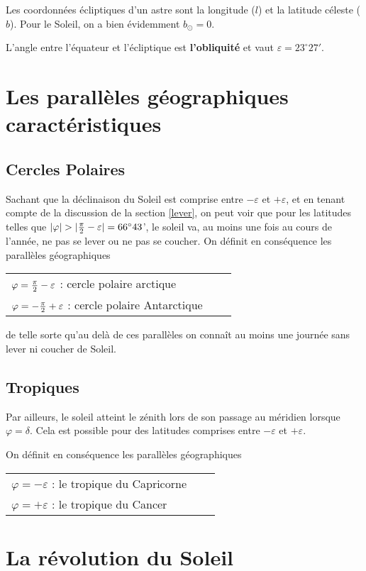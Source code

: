 \documentclass[12pt]{report}
\def\sun{\odot}
\begin{document}
Les coordonnées écliptiques d'un astre sont la longitude ($l$) et la latitude céleste ($b$). Pour le Soleil, on a bien évidemment $b_\sun=0$. 

L'angle entre l'équateur et l'écliptique est \textbf{l'obliquité} et vaut $\varepsilon = 23^\circ 27'$.

\section{Les parallèles géographiques caractéristiques}
\subsection{Cercles Polaires}

Sachant que la déclinaison du Soleil est comprise entre $-\varepsilon$ et $+\varepsilon$, et en tenant compte de la discussion de la section \ref{lever}, on peut voir que pour les latitudes telles que 
 $|\varphi| > |{\pi\over 2}- \varepsilon|=66^\circ 43$', le soleil va, au moins une fois au cours de l'année, ne pas se lever ou ne pas se coucher. On définit en conséquence  les parallèles géographiques   
\begin{tabular}{lll}
$\varphi = {\pi \over 2} - \varepsilon$ : cercle polaire arctique\\
$\varphi = - {\pi \over 2} + \varepsilon$ : cercle polaire Antarctique
\end{tabular}

de  telle sorte qu'au delà de ces parallèles on connaît au moins une journée sans lever ni coucher de Soleil.
\subsection{Tropiques}

Par ailleurs, le soleil atteint le zénith lors de son passage au méridien lorsque $\varphi = \delta$. Cela est possible pour des latitudes comprises entre  $-\varepsilon$ et $+\varepsilon$. 

 On définit en conséquence  les parallèles géographiques   
\begin{tabular}{lll}
$\varphi = - \varepsilon$ : le tropique du Capricorne \\
$\varphi = + \varepsilon$ : le tropique du Cancer 
\end{tabular}


\section{La révolution du Soleil}
\end{document}
